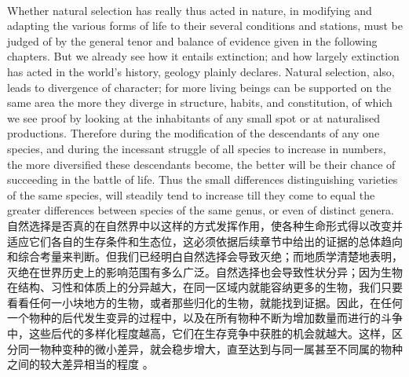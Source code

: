 \documentclass{article}
\begin{document}
\\
Whether natural selection has really thus acted in nature, in modifying and adapting the various forms of life to their several conditions and stations, must be judged of by the general tenor and balance of evidence given in the following chapters. But we already see how it entails extinction; and how largely extinction has acted in the world’s history, geology plainly declares. Natural selection, also, leads to divergence of character; for more living beings can be supported on the same area the more they diverge in structure, habits, and constitution, of which we see proof by looking at the inhabitants of any small spot or at naturalised productions. Therefore during the modification of the descendants of any one species, and during the incessant struggle of all species to increase in numbers, the more diversified these descendants become, the better will be their chance of succeeding in the battle of life. Thus the small differences distinguishing varieties of the same species, will steadily tend to increase till they come to equal the greater differences between species of the same genus, or even of distinct genera.\\
自然选择是否真的在自然界中以这样的方式发挥作用，使各种生命形式得以改变并适应它们各自的生存条件和生态位，这必须依据后续章节中给出的证据的总体趋向和综合考量来判断。但我们已经明白自然选择会导致灭绝；而地质学清楚地表明，灭绝在世界历史上的影响范围有多么广泛。自然选择也会导致性状分异；因为生物在结构、习性和体质上的分异越大，在同一区域内就能容纳更多的生物，我们只要看看任何一小块地方的生物，或者那些归化的生物，就能找到证据。因此，在任何一个物种的后代发生变异的过程中，以及在所有物种不断为增加数量而进行的斗争中，这些后代的多样化程度越高，它们在生存竞争中获胜的机会就越大。这样，区分同一物种变种的微小差异，就会稳步增大，直至达到与同一属甚至不同属的物种之间的较大差异相当的程度 。 
\end{document}
